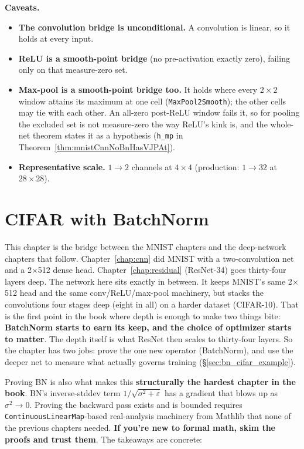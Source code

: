 \medskip\noindent\textbf{Caveats.}
\begin{itemize}
  \item \textbf{The convolution bridge is unconditional.} A convolution
    is linear, so it holds at every input.
  \item \textbf{ReLU is a smooth-point bridge} (no pre-activation exactly
    zero), failing only on that measure-zero set.
  \item \textbf{Max-pool is a smooth-point bridge too.} It holds where
    every $2\times2$ window attains its maximum at one cell
    (\texttt{MaxPool2Smooth}); the other cells may tie with each other. An
    all-zero post-ReLU window fails it, so for pooling the excluded set is
    not measure-zero the way ReLU's kink is, and the whole-net theorem
    states it as a hypothesis (\texttt{h\_mp} in
    Theorem~\ref{thm:mnistCnnNoBnHasVJPAt}).
  \item \textbf{Representative scale.} $1{\to}2$ channels at $4\times4$
    (production: $1{\to}32$ at $28\times28$).
\end{itemize}

\chapter{CIFAR with BatchNorm}
\label{chap:bn}

This chapter is the bridge between the MNIST chapters and the
deep-network chapters that follow. Chapter~\ref{chap:cnn} did MNIST
with a two-convolution net and a 2$\times$512 dense head.
Chapter~\ref{chap:residual} (ResNet-34) goes thirty-four layers deep.
The network here sits exactly in between. It keeps MNIST's
same 2$\times$512 head and the same conv/ReLU/max-pool
machinery, but stacks the convolutions four stages deep (eight in all)
on a harder dataset (CIFAR-10). That is the first point in the book
where depth is enough to make two things bite: \textbf{BatchNorm starts
to earn its keep, and the choice of optimizer starts to matter}. The
depth itself is what ResNet then scales to thirty-four layers. So
the chapter has two jobs: prove the one new operator (BatchNorm), and
use the deeper net to measure what actually governs training
(\S\ref{sec:bn_cifar_example}).

Proving BN is also what makes this \textbf{structurally the hardest
chapter in the book}. BN's
inverse-stddev term \(1/\sqrt{\sigma^2 + \varepsilon}\) has a
gradient that blows up as \(\sigma^2 \to 0\). Proving the
backward pass exists and is bounded requires
\texttt{ContinuousLinearMap}-based real-analysis machinery from
Mathlib that none of the previous chapters needed.
\textbf{If you're new to formal math, skim the proofs and trust
them}. The takeaways are concrete:

